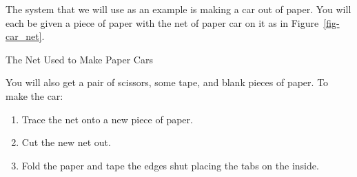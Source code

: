 \documentclass[
  10pt,
  a4paperpaper,
  DIV=11,
  numbers=noendperiod,
  oneside]{scrreprt}
\providecommand{\tightlist}{%
  \setlength{\itemsep}{0pt}\setlength{\parskip}{0pt}}\usepackage{longtable,booktabs,array}
\begin{document}
The system that we will use as an example is making a car out of paper.
You will each be given a piece of paper with the net of paper car on it
as in Figure~\ref{fig-car_net}.

\begin{marginfigure}


\caption{\label{fig-car_net}The Net Used to Make Paper Cars}

\end{marginfigure}%

You will also get a pair of scissors, some tape, and blank pieces of
paper. To make the car:

\begin{enumerate}
\def\labelenumi{\arabic{enumi}.}
\tightlist
\item
  Trace the net onto a new piece of paper.
\item
  Cut the new net out.
\item
  Fold the paper and tape the edges shut placing the tabs on the inside.
\end{enumerate}
\end{document}
